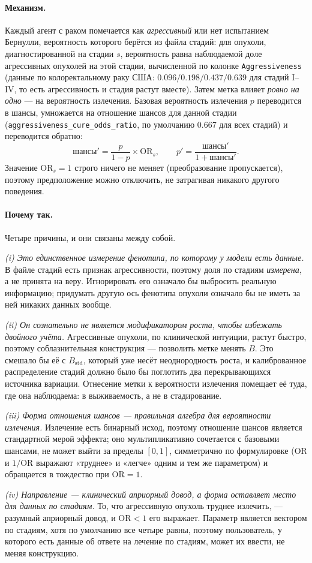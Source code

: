 \documentclass[12pt,a4paper]{article}
\newcommand{\id}[1]{\texttt{#1}}
\newcommand{\mech}[1]{\paragraph{Механизм.} #1}
\newcommand{\why}[1]{\paragraph{Почему так.} #1}
\begin{document}
\mech{Каждый агент с раком помечается как \emph{агрессивный} или нет испытанием Бернулли, вероятность
которого берётся из файла стадий: для опухоли, диагностированной на стадии $s$, вероятность равна
наблюдаемой доле агрессивных опухолей на этой стадии, вычисленной по колонке \id{Aggressiveness} (данные по
колоректальному раку США: $0.096 / 0.198 / 0.437 / 0.639$ для стадий I--IV, то есть агрессивность и стадия
растут вместе). Затем метка влияет \emph{ровно на одно} --- на вероятность излечения. Базовая вероятность
излечения $p$ переводится в шансы, умножается на отношение шансов для данной стадии
(\id{aggressiveness\_cure\_odds\_ratio}, по умолчанию $0.667$ для всех стадий) и переводится обратно:
\[
\text{шансы}' = \frac{p}{1-p}\times \mathrm{OR}_s, \qquad
p' = \frac{\text{шансы}'}{1 + \text{шансы}'}.
\]
Значение $\mathrm{OR}_s = 1$ строго ничего не меняет (преобразование пропускается), поэтому предположение
можно отключить, не затрагивая никакого другого поведения.}

\why{Четыре причины, и они связаны между собой.

\emph{(i) Это единственное измерение фенотипа, по которому у модели есть данные.} В файле стадий есть
признак агрессивности, поэтому доля по стадиям \emph{измерена}, а не принята на веру. Игнорировать его
означало бы выбросить реальную информацию; придумать другую ось фенотипа опухоли означало бы не иметь за
ней никаких данных вообще.

\emph{(ii) Он сознательно не является модификатором роста, чтобы избежать двойного учёта.} Агрессивные
опухоли, по клинической интуиции, растут быстро, поэтому соблазнительная конструкция --- позволить метке
менять $B$. Это смешало бы её с $B_{\text{std}}$, который уже несёт неоднородность роста, и калиброванное
распределение стадий должно было бы поглотить два перекрывающихся источника вариации. Отнесение метки к
вероятности излечения помещает её туда, где она наблюдаема: в выживаемость, а не в стадирование.

\emph{(iii) Форма отношения шансов --- правильная алгебра для вероятности излечения.} Излечение есть бинарный
исход, поэтому отношение шансов является стандартной мерой эффекта; оно мультипликативно сочетается с
базовыми шансами, не может выйти за пределы $[0,1]$, симметрично по формулировке ($\mathrm{OR}$ и
$1/\mathrm{OR}$ выражают «труднее» и «легче» одним и тем же параметром) и обращается в тождество при
$\mathrm{OR} = 1$.

\emph{(iv) Направление --- клинический априорный довод, а форма оставляет место для данных по стадиям.}
То, что агрессивную опухоль труднее излечить, --- разумный априорный довод, и $\mathrm{OR}<1$ его выражает.
Параметр является вектором по стадиям, хотя по умолчанию все четыре равны, поэтому пользователь, у которого
есть данные об ответе на лечение по стадиям, может их ввести, не меняя конструкцию.}
\end{document}
